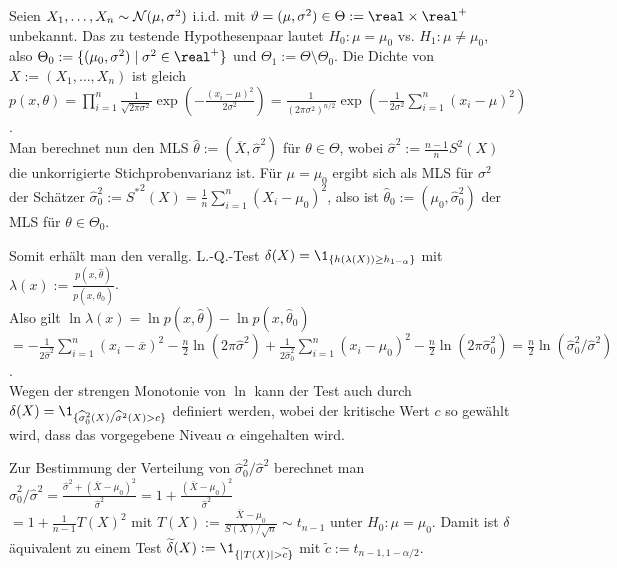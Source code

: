\linie

\begin{Bsp}
    Seien $X_1, \dotsc, X_n \sim \mathcal{N}(\mu, \sigma^2)$ i.i.d.
    mit $\theta = (\mu, \sigma^2) \in \Theta := \real \times \real^+$ unbekannt.
    Das zu testende Hypothesenpaar lautet $H_0\colon \mu = \mu_0$ vs. $H_1\colon \mu \not= \mu_0$,
    also $\Theta_0 := \{(\mu_0, \sigma^2) \;|\; \sigma^2 \in \real^+\}$ und
    $\Theta_1 := \Theta \setminus \Theta_0$.
    Die Dichte von $X := (X_1, \dotsc, X_n)$ ist gleich\\
    $p(x, \theta) = \prod_{i=1}^n \frac{1}{\sqrt{2\pi\sigma^2}}
    \exp\!\left(-\frac{(x_i - \mu)^2}{2\sigma^2}\right)
    = \frac{1}{(2\pi\sigma^2)^{n/2}} \exp\!\left(-\frac{1}{2\sigma^2}
    \sum_{i=1}^n (x_i - \mu)^2\right)$.\\
    Man berechnet nun den MLS $\widehat{\theta} := (\overline{X}, \widehat{\sigma}^2)$
    für $\theta \in \Theta$, wobei
    $\widehat{\sigma}^2 := \frac{n-1}{n} S^2(X)$ die unkorrigierte Stichprobenvarianz ist.
    Für $\mu = \mu_0$ ergibt sich als MLS für $\sigma^2$ der Schätzer
    $\widehat{\sigma}_0^2 := {S^\ast}^2(X) = \frac{1}{n} \sum_{i=1}^n (X_i - \mu_0)^2$,
    also ist $\widehat{\theta}_0 := (\mu_0, \widehat{\sigma}_0^2)$ der MLS für
    $\theta \in \Theta_0$.
    
    Somit erhält man den verallg. L.-Q.-Test $\delta(X) = \1_{\{h(\lambda(X)) \ge h_{1-\alpha}\}}$
    mit $\lambda(x) := \frac{p(x, \widehat{\theta})}{p(x, \widehat{\theta}_0)}$.\\
    Also gilt $\ln \lambda(x)
    = \ln p(x, \widehat{\theta}) - \ln p(x, \widehat{\theta}_0)$\\
    $= -\frac{1}{2\widehat{\sigma}^2} \sum_{i=1}^n (x_i - \overline{x})^2 -
    \frac{n}{2} \ln(2\pi\widehat{\sigma}^2) +
    \frac{1}{2\widehat{\sigma}_0^2} \sum_{i=1}^n (x_i - \mu_0)^2 -
    \frac{n}{2} \ln(2\pi\widehat{\sigma}_0^2)
    = \frac{n}{2} \ln(\widehat{\sigma}_0^2/\widehat{\sigma}^2)$.\\
    Wegen der strengen Monotonie von $\ln$ kann der Test auch
    durch $\delta(X) = \1_{\{\widehat{\sigma}_0^2(X)/\widehat{\sigma}^2(X) > c\}}$
    definiert werden, wobei der kritische Wert $c$ so gewählt wird,
    dass das vorgegebene Niveau $\alpha$ eingehalten wird.
    
    Zur Bestimmung der Verteilung von $\widehat{\sigma}_0^2/\widehat{\sigma}^2$
    berechnet man
    $\widehat{\sigma}_0^2/\widehat{\sigma}^2
    = \frac{\widehat{\sigma}^2 + (\overline{X} - \mu_0)^2}{\widehat{\sigma}^2}
    = 1 + \frac{(\overline{X} - \mu_0)^2}{\widehat{\sigma}^2}$\\
    $= 1 + \frac{1}{n-1} T(X)^2$ mit $T(X) := \frac{\overline{X} - \mu_0}{S(X)/\sqrt{n}} \sim
    t_{n-1}$ unter $H_0\colon \mu = \mu_0$.
    Damit ist $\delta$ äquivalent zu einem Test
    $\widetilde{\delta}(X) := \1_{\{|T(X)| > \widetilde{c}\}}$ mit
    $\widetilde{c} := t_{n-1,1-\alpha/2}$.
    

\end{Bsp}

